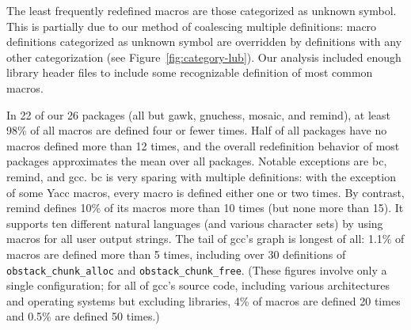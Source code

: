 \documentclass[10pt]{article}
\newcommand{\pkg}[1]{\textsf{#1}}
\begin{document}

The least frequently redefined macros are those categorized as unknown
symbol.  This is partially due to our method of coalescing multiple
definitions:  macro definitions categorized as unknown symbol are overridden
by definitions with any other categorization (see
Figure~\ref{fig:category-lub}).  Our
analysis included enough library header files to include some
recognizable definition of most common macros.


In 22 of our 26 packages (all but \pkg{gawk}, \pkg{gnuchess},
\pkg{mosaic}, and \pkg{remind}), at least 98\% of all macros are defined
four or fewer times.  Half of all packages have no macros defined more than
12 times, and the overall redefinition behavior of most packages
approximates the mean over all packages.  Notable
exceptions are \pkg{bc}, \pkg{remind}, and \pkg{gcc}.  \pkg{bc} is very
sparing with multiple definitions: with the exception of some Yacc macros,
every macro is defined either one or two times.  By contrast, \pkg{remind}
defines 10\% of its macros more than 10 times (but none more than 15).  It
supports ten different natural languages (and various character sets) by
using macros for all user output strings.  The tail of \pkg{gcc}'s graph is
longest of all: 1.1\% of macros are defined more than 5 times, including
over 30 definitions of \verb|obstack_chunk_alloc| and
\verb|obstack_chunk_free|.  (These figures involve only a single
configuration; for all of \pkg{gcc}'s source code, including various
architectures and operating systems but excluding libraries, 4\% of macros
are defined 20 times and 0.5\% are defined 50 times.)
\end{document}
